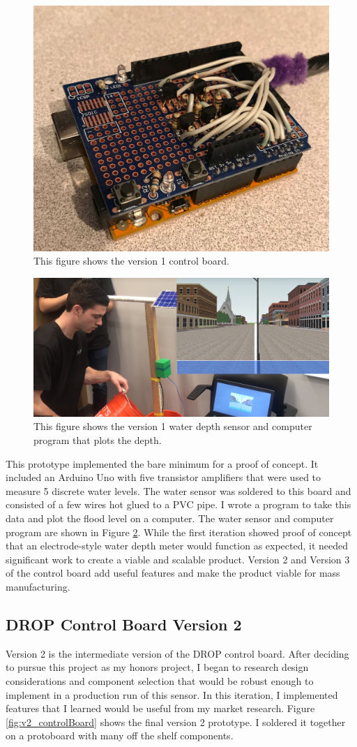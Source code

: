 \documentclass[letter]{article}
\begin{document}
\begin{figure}[ht]
 	\centering
 	\includegraphics[width=.5\textwidth]{img/v1_ControlBoard.jpg}
 	\caption{\label{fig:v1Board} This figure shows the version 1 control board.}
\end{figure}

\begin{figure}[ht]
	\centering
	\includegraphics[width=.7\textwidth]{img/v1_WaterDepth.PNG}
	\caption{\label{fig:v1WaterDepth} This figure shows the version 1 water depth sensor and computer program that plots the depth.}
\end{figure}
This prototype implemented the bare minimum for a proof of concept. It included an Arduino Uno with five transistor amplifiers that were used to measure 5 discrete water levels. The water sensor was soldered to this board and consisted of a few wires hot glued to a PVC pipe. I wrote a program to take this data and plot the flood level on a computer. The water sensor and computer program are shown in Figure \ref{fig:v1WaterDepth}. While the first iteration showed proof of concept that an electrode-style water depth meter would function as expected, it needed significant work to create a viable and scalable product. Version 2 and Version 3 of the control board add useful features and make the product viable for mass manufacturing. 
 
\subsection{DROP Control Board Version 2}
Version 2 is the intermediate version of the DROP control board. After deciding to pursue this project as my honors project, I began to research design considerations and component selection that would be robust enough to implement in a production run of this sensor. In this iteration, I implemented features that I learned would be useful from my market research. Figure \ref{fig:v2_controlBoard} shows the final version 2 prototype. I soldered it together on a protoboard with many off the shelf components. 
\end{document}

